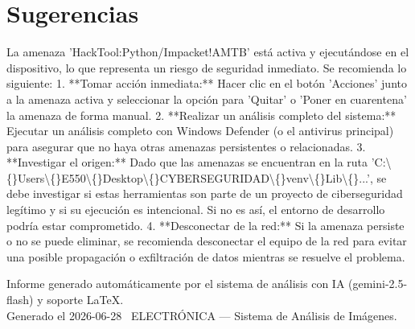 \documentclass[11pt,a4paper]{article}
\begin{document}
\section*{Sugerencias}
La amenaza 'HackTool:Python/Impacket!AMTB' está activa y ejecutándose en el dispositivo, lo que representa un riesgo de seguridad inmediato. Se recomienda lo siguiente:
1.  **Tomar acción inmediata:** Hacer clic en el botón 'Acciones' junto a la amenaza activa y seleccionar la opción para 'Quitar' o 'Poner en cuarentena' la amenaza de forma manual.
2.  **Realizar un análisis completo del sistema:** Ejecutar un análisis completo con Windows Defender (o el antivirus principal) para asegurar que no haya otras amenazas persistentes o relacionadas.
3.  **Investigar el origen:** Dado que las amenazas se encuentran en la ruta 'C:\textbackslash\{\}Users\textbackslash\{\}E550\textbackslash\{\}Desktop\textbackslash\{\}CYBERSEGURIDAD\textbackslash\{\}venv\textbackslash\{\}Lib\textbackslash\{\}...', se debe investigar si estas herramientas son parte de un proyecto de ciberseguridad legítimo y si su ejecución es intencional. Si no es así, el entorno de desarrollo podría estar comprometido.
4.  **Desconectar de la red:** Si la amenaza persiste o no se puede eliminar, se recomienda desconectar el equipo de la red para evitar una posible propagación o exfiltración de datos mientras se resuelve el problema.

\vspace{12pt}
\begin{center}
  \footnotesize\color{gray}
  Informe generado automáticamente por el sistema de análisis con IA (gemini-2.5-flash) y soporte LaTeX. \\
  Generado el 2026-06-28 \textbullet\ ELECTRÓNICA --- Sistema de Análisis de Imágenes.
\end{center}
\end{document}
